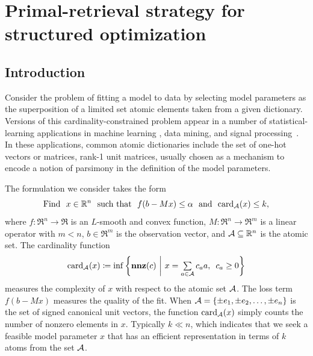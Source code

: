 \chapter{Primal-retrieval strategy for structured optimization}
\label{ch:App-Primal-Retrieval}

\section{Introduction} \label{sec:4-1}

Consider the problem of fitting a model to data by selecting model parameters as the superposition of a limited set atomic elements taken from a given dictionary. Versions of this cardinality-constrained problem appear in a number of statistical-learning applications in machine learning \cite{tibshirani1996regression,yul06,Meinshausen06,aep08}, data mining, and signal processing~\cite{candes:2013}. In these applications, common atomic dictionaries include the set of one-hot vectors or matrices, rank-1 unit matrices, usually chosen as a mechanism to encode a notion of parsimony in the definition of the model parameters.

The formulation we consider takes the form
\begin{equation} \label{eq:main_prob} 
    \mathop{\hbox{\rm Find}}\enspace x\in\mathbb{R}^n \enspace\mathop{\hbox{\rm such that}}\enspace f(b - Mx) \leq \alpha \enspace\mathop{\hbox{\rm and}}\enspace \operatorname{card}_{\mathcal{A}}(x) \leq k,
\end{equation}
where $f:\Re^n\to\Re$ is an $L$-smooth and convex function, $M: \Re^n \to \Re^m$ is a linear operator with $m < n$, $b \in \Re^m$ is the observation vector, and $\mathcal{A} \subseteq \mathbb{R}^n$ is the atomic set. The cardinality function 
\begin{equation}\label{eq-card-fcn}
    \operatorname{card}_{\mathcal{A}}(x) \coloneqq \inf\left\{ \mathbf{nnz}(c) ~\bigg\vert~ x = \textstyle\sum\limits_{a \in \mathcal{A}} c_a a, \enspace c_a \geq 0\right\}
\end{equation}
measures the complexity of $x$ with respect to the atomic set $\mathcal{A}$.  The loss term $f(b - Mx)$ measures the quality of the fit. When $\mathcal{A} = \{ \pm e_1,\pm e_2, \ldots,\pm e_n \}$ is the set of signed canonical unit vectors, the function $\operatorname{card}_{\mathcal{A}}(x)$ simply counts the number of nonzero elements in $x$. Typically $k\ll n$, which indicates that we seek a feasible model parameter $x$ that has an efficient representation in terms of $k$ atoms from the set $\mathcal{A}$.

